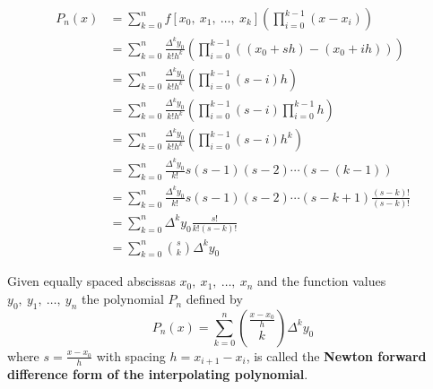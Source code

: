 \documentclass{article}
\begin{document}
\begin{align*}
    P_n\left( x \right) & = \sum_{k = 0}^n f\left[ x_0,\: x_1,\: \dots,\: x_k \right] \left( \prod_{i = 0}^{k - 1} \left( x - x_i \right) \right)                                                 \\
                        & = \sum_{k = 0}^n \frac{\Delta^k y_0}{k! h^k} \left( \prod_{i = 0}^{k - 1} \left( \left( x_0 + s h \right) - \left( x_0 + i h \right) \right) \right)                    \\
                        & = \sum_{k = 0}^n \frac{\Delta^k y_0}{k! h^k} \left( \prod_{i = 0}^{k - 1} \left( s - i \right)h \right)                                                                 \\
                        & = \sum_{k = 0}^n \frac{\Delta^k y_0}{k! h^k} \left( \prod_{i = 0}^{k - 1} \left( s - i \right) \prod_{i = 0}^{k - 1} h \right)                                          \\
                        & = \sum_{k = 0}^n \frac{\Delta^k y_0}{k! h^k} \left( \prod_{i = 0}^{k - 1} \left( s - i \right) h^k \right)                                                              \\
                        & = \sum_{k = 0}^n \frac{\Delta^k y_0}{k!} s\left( s - 1 \right) \left( s - 2 \right) \cdots \left( s - \left( k - 1 \right) \right)                                      \\
                        & = \sum_{k = 0}^n \frac{\Delta^k y_0}{k!} s\left( s - 1 \right) \left( s - 2 \right) \cdots \left( s - k + 1 \right) \frac{\left( s - k \right)!}{\left( s - k \right)!} \\
                        & = \sum_{k = 0}^n \Delta^k y_0 \frac{s!}{k!\left( s - k \right)!}                                                                                                        \\
                        & = \sum_{k = 0}^n \binom{s}{k} \Delta^k y_0
\end{align*}
\begin{definition}
    Given equally spaced abscissas \(x_0,\: x_1,\: \dots,\: x_n\) and
    the function values \(y_0,\: y_1,\: \dots,\: y_n\) the polynomial
    \(P_n\) defined by
    \begin{equation*}
        P_n\left( x \right) = \sum_{k = 0}^n \binom{\frac{x - x_0}{h}}{k} \Delta^k y_0
    \end{equation*}
    where \(s = \frac{x - x_0}{h}\) with spacing
    \(h = x_{i + 1} - x_i\), is called the \textbf{Newton forward
        difference form of the interpolating polynomial}.
\end{definition}
\end{document}
